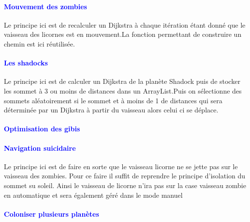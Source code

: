 \documentclass{report}
\begin{document}
			\paragraph{\textcolor{blue}{Mouvement des zombies}}
			Le principe ici est de recalculer un Dijkstra à chaque itération étant donné que le vaisseau des licornes est en mouvement.La fonction permettant de construire un chemin est ici réutilisée.
			\paragraph{\textcolor{blue}{Les shadocks}}
			Le principe ici est de calculer un Dijkstra de la planète Shadock puis de stocker les sommet à 3 ou moins de distances dans un ArrayList.Puis on sélectionne des sommets aléatoirement si le sommet et à moins de 1 de distances qui sera déterminée par un Dijkstra à partir du vaisseau alors celui ci se déplace.
			\paragraph{\textcolor{blue}{Optimisation des gibis}}
			\paragraph{\textcolor{blue}{Navigation suicidaire}}
			Le principe ici est de faire en sorte que le vaisseau licorne ne se jette pas sur le vaisseau des zombies.
			Pour ce faire il suffit de reprendre le principe d'isolation du sommet su soleil.
			Ainsi le vaisseau de licorne n'ira pas sur la case vaisseau zombie en automatique et sera également géré dans le mode manuel
			\paragraph{\textcolor{blue}{Coloniser plusieurs planètes}}
	\setcounter{tocdepth}{4}
	\tableofcontents
\end{document}
